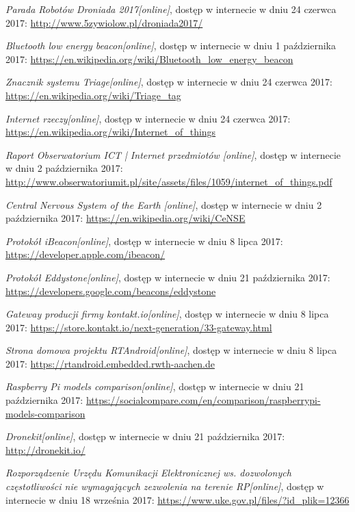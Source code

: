 \begin{thebibliography}{99}
 \emph{Parada Robotów Droniada 2017[online]}, dostęp w internecie w dniu 24 czerwca 2017:
 \url{http://www.5zywiolow.pl/droniada2017/}

 \emph{Bluetooth low energy beacon[online]}, dostęp w internecie w dniu 1 października 2017:
 \url{https://en.wikipedia.org/wiki/Bluetooth_low_energy_beacon}
 
 \emph{Znacznik systemu Triage[online]}, dostęp w internecie w dniu 24 czerwca 2017:
 \url{https://en.wikipedia.org/wiki/Triage_tag}

 \emph{Internet rzeczy[online]}, dostęp w internecie w dniu 24 czerwca 2017:
 \url{https://en.wikipedia.org/wiki/Internet_of_things}

 \emph{Raport Obserwatorium ICT | Internet przedmiotów [online]}, dostęp w internecie w dniu 2 października 2017:
 \url{http://www.obserwatoriumit.pl/site/assets/files/1059/internet_of_things.pdf}
 
 \emph{Central Nervous System of the Earth [online]}, dostęp w internecie w dniu 2 października 2017:
 \url{https://en.wikipedia.org/wiki/CeNSE}

 \emph{Protokół iBeacon[online]}, dostęp w internecie w dniu 8 lipca 2017:
 \url{https://developer.apple.com/ibeacon/}

 \emph{Protokół Eddystone[online]}, dostęp w internecie w dniu 21 października 2017:
 \url{https://developers.google.com/beacons/eddystone}

 \emph{Gateway producji firmy kontakt.io[online]}, dostęp w internecie w dniu 8 lipca 2017:
 \url{https://store.kontakt.io/next-generation/33-gateway.html}

 \emph{Strona domowa projektu RTAndroid[online]}, dostęp w internecie w dniu 8 lipca 2017:
 \url{https://rtandroid.embedded.rwth-aachen.de}

 \emph{Raspberry Pi models comparison[online]}, dostęp w internecie w dniu 21 października 2017:
 \url{https://socialcompare.com/en/comparison/raspberrypi-models-comparison}
 
 \emph{Dronekit[online]}, dostęp w internecie w dniu 21 października 2017:
 \url{http://dronekit.io/}
 
 \emph{Rozporządzenie Urzędu Komunikacji Elektronicznej ws. dozwolonych częstotliwości nie wymagających zezwolenia na terenie RP[online]}, dostęp w internecie w dniu 18 września 2017:
 \url{https://www.uke.gov.pl/files/?id_plik=12366}


\end{thebibliography}
